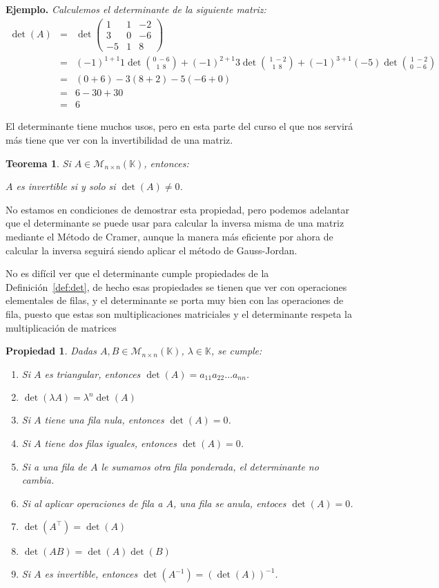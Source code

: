 \documentclass[12pt]{book}
\newtheorem{teo}{Teorema}
\newtheorem{prop}{Propiedad}
\def\K{\mathbb{K}}
\begin{document}
{\bf Ejemplo.} {\em Calculemos el determinante de la siguiente matriz:
  \begin{eqnarray*}
    \det(A)&=&
    \det\left(\begin{array}{rrr}1&1&-2\\3&0&-6\\-5&1&8\end{array}\right)\\
      &=&
      (-1)^{1+1}1\det{0\ -6 \choose 1\ \ 8}+(-1)^{2+1}3\det{\ 1\ -2\choose 1\ \ 8}+(-1)^{3+1}(-5)\det{\ 1\ -2\choose 0\ -6}\\
      &=&
      (0+6)-3(8+2)-5(-6+0)\\
      &=&6-30+30\\
      &=&6
  \end{eqnarray*}
}

 

El determinante tiene muchos usos, pero en esta parte del curso el que nos servirá más tiene que ver con la invertibilidad de una matriz.
\begin{teo} Si $A\in\mathcal{M}_{n\times n}(\K)$, entonces:
   \begin{center} $A$ es invertible si y solo si $\det(A)\not=0$.\end{center}
\end{teo}
No estamos en condiciones de demostrar esta propiedad, pero podemos adelantar que el determinante se puede usar para calcular la inversa misma de una matriz mediante el Método de Cramer, aunque la manera más eficiente por ahora de calcular la inversa seguirá siendo aplicar el método de Gauss-Jordan.

No es difícil ver que el determinante cumple propiedades de la Definición~\ref{def:det}, de hecho esas propiedades se tienen que ver con operaciones elementales de filas, y el determinante se porta muy bien con las operaciones de fila, puesto que estas son multiplicaciones matriciales y el determinante respeta la multiplicación de matrices
 

\begin{prop}\label{prop:det}
  Dadas $A,B\in\mathcal{M}_{n\times n}(\K)$, $\lambda\in\K$, se cumple:
  \begin{enumerate}
  \item Si $A$ es triangular, entonces $\det(A)=a_{11}a_{22}\dots a_{nn}$. 
  \item $\det(\lambda A)=\lambda^n\det(A)$
  \item Si $A$ tiene una fila nula, entonces $\det(A)=0$.
  \item Si $A$ tiene dos filas iguales, entonces $\det(A)=0$.
  \item Si a una fila de $A$ le sumamos otra fila ponderada, el determinante no cambia.
  \item Si al aplicar operaciones de fila a $A$, una fila se anula, entoces $\det(A)=0$.
  \item $\det(A^\top)=\det(A)$
  \item $\det(AB)=\det(A)\det(B)$
  \item Si $A$ es invertible, entonces $\det(A^{-1})=(\det(A))^{-1}$.
  \end{enumerate}
\end{prop}
\end{document}
